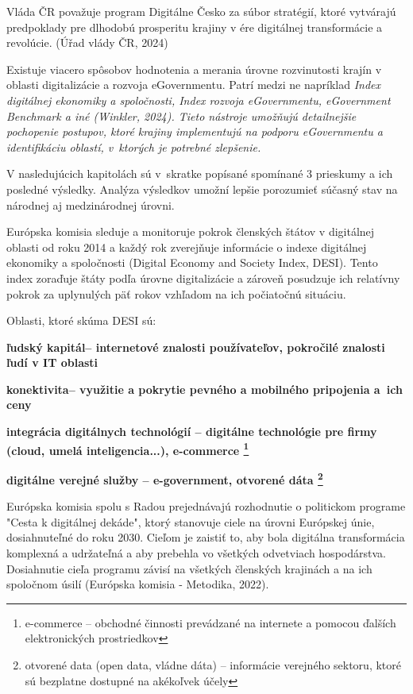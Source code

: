 Vláda ČR považuje program Digitálne Česko za súbor stratégií, ktoré vytvárajú predpoklady pre dlhodobú prosperitu krajiny v ére digitálnej transformácie a revolúcie. (Úřad vlády ČR, 2024)


Existuje viacero spôsobov hodnotenia a merania úrovne rozvinutosti krajín v oblasti digitalizácie a rozvoja eGovernmentu. Patrí medzi ne napríklad \start \it Index digitálnej ekonomiky a spoločnosti, Index rozvoja eGovernmentu, eGovernment Benchmark \stop a iné \scr(Winkler, 2024). Tieto nástroje umožňujú detailnejšie pochopenie postupov, ktoré krajiny implementujú na podporu eGovernmentu a identifikáciu oblastí, v~ktorých je potrebné zlepšenie.

V nasledujúcich kapitolách sú v~skratke popísané spomínané 3 prieskumy a ich posledné výsledky. Analýza výsledkov umožní lepšie porozumieť súčasný stav na národnej aj medzinárodnej úrovni.

Európska komisia sleduje a monitoruje pokrok členských štátov v digitálnej oblasti od roku 2014 a každý rok zverejňuje informácie o indexe digitálnej ekonomiky a spoločnosti (Digital Economy and Society Index, DESI). Tento index zoraďuje štáty podľa úrovne digitalizácie a zároveň posudzuje ich relatívny pokrok za uplynulých päť rokov vzhľadom na ich počiatočnú situáciu.

Oblasti, ktoré skúma DESI sú:

\startitemize
\item{\start\bf ľudský kapitál\stop -- internetové znalosti používateľov, pokročilé znalosti ľudí v IT oblasti}
\item{\start\bf konektivita\stop -- využitie a pokrytie pevného a mobilného pripojenia a~ich ceny}
\item{\start\bf integrácia digitálnych technológií \stop -- digitálne technológie pre firmy (cloud, umelá inteligencia...), e-commerce \footnote{e-commerce -- obchodné činnosti prevádzané na internete a pomocou ďalších elektronických prostriedkov}}
\item{\start\bf digitálne verejné služby \stop -- e-government, otvorené dáta \footnote{otvorené data (open data, vládne dáta) -- informácie verejného sektoru, ktoré sú bezplatne dostupné na akékoľvek účely}}
\stopitemize 

Európska komisia spolu s Radou prejednávajú rozhodnutie o politickom programe "Cesta k digitálnej dekáde", ktorý stanovuje ciele na úrovni Európskej únie, dosiahnuteľné do roku 2030. Cieľom je zaistiť to, aby bola digitálna transformácia komplexná a udržateľná a aby prebehla vo všetkých odvetviach hospodárstva. Dosiahnutie cieľa programu závisí na všetkých členských krajinách a na ich spoločnom úsilí \scr(Európska komisia - Metodika, 2022).

